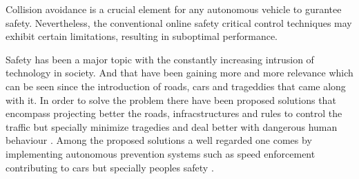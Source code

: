 
Collision avoidance is a crucial element for any autonomous vehicle to gurantee safety.  Nevertheless,  the conventional online safety critical control techniques may exhibit certain limitations, resulting in suboptimal performance. \par

Safety has been a major topic with the constantly increasing intrusion of technology in society. And that have been gaining more and more relevance which can be seen since the introduction of roads, cars and trageddies that came along with it. In order to solve the problem there have been proposed solutions that encompass projecting better the roads, infracstructures and rules to control the traffic but specially minimize tragedies and deal better with dangerous human behaviour \cite{naumann2020systems}. Among the proposed solutions a well regarded one comes by implementing autonomous prevention systems such as speed enforcement contributing to cars but specially peoples safety \cite{seiler1998development, naumann2020systems}.\par

